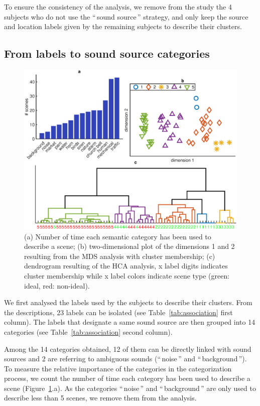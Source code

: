 \documentclass[twoside,twocolumn]{article}
\begin{document}

To ensure the consistency of the analysis, we remove from the study the 4 subjects who do not use the ``\,sound source\,'' strategy, and only keep the source and location labels given by the remaining subjects to describe their clusters. 

\subsection{From labels to sound source categories}
\label{sec:fromLab2Cat}

\begin{figure}[t!]
\centering
\includegraphics[width=.8\paperwidth]{../gfxMatlab/xp3_1.eps} 
\caption{\label{fig:xp3_1} (a) Number of time each semantic category has been used to describe a scene; (b) two-dimensional plot of the dimensions 1 and 2 resulting from the MDS analysis with cluster membership; (c) dendrogram resulting of the HCA analysis, x label digits indicates cluster membership while x label colors indicate scene type (green: ideal, red: non-ideal).}
\end{figure}

We first analysed the labels used by the subjects to describe their clusters. From the descriptions, 23 labels can be isolated (see Table~\ref{tab:association} first column). The labels that designate a same sound source are then grouped into 14 categories (see Table~\ref{tab:association} second column).   

Among the 14 categories obtained, 12 of them can be directly linked with sound sources and 2 are referring to ambiguous sounds (``\,noise\,'' and ``\,background\,''). To measure the relative importance of the categories in the categorization process, we count the number of time each category has been used to describe a scene (Figure~\ref{fig:xp3_1}.a). As the categories ``\,noise\,'' and ``\,background\,'' are only used to describe less than 5 scenes, we remove them from the analysis.
\end{document}
